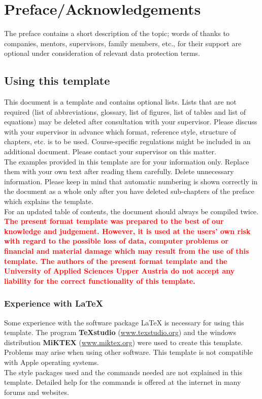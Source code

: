 \chapter{Preface/Acknowledgements}
The preface contains a short description of the topic; words of thanks to companies, mentors, supervisors, family members, etc., for their support are optional under consideration of relevant data protection terms.

\section{Using this template}
This document is a template and contains optional lists. Lists that are not required (list of abbreviations, glossary, list of figures, list of tables and list of equations) may be deleted after consultation with your supervisor. Please discuss with your supervisor in advance which format, reference style, structure of chapters, etc. is to be used. Course-specific regulations might be included in an additional document. Please contact your supervisor on this matter.
\vspace{6pt}\\
The examples provided in this template are for your information only. Replace them with your own text after reading them carefully. Delete unnecessary information. Please keep in mind that automatic numbering is shown correctly in the document as a whole only after you have deleted sub-chapters of the preface which explains the template.
\vspace{6pt}\\
For an updated table of contents, the document should always be compiled twice.
\vspace{6pt}\\
\textcolor{red}{\textbf{The present format template was prepared to the best of our knowledge and judgement. However, it is used at the users’ own risk with regard to the possible loss of data, computer problems or financial and material damage which may result from the use of this template. The authors of the present format template and the University of Applied Sciences Upper Austria do not accept any liability for the correct functionality of this template.}}



\newpage
\subsection{Experience with \LaTeX}
Some experience with the software package {\LaTeX} is necessary for using this template. The program \textbf{TeXstudio} (\url{www.texstudio.org}) and the windows distribution \textbf{MiKTEX} (\url{www.miktex.org}) were used to create this template. Problems may arise when using other software. This template is not compatible with Apple operating systems.\\
The style packages used and the commands needed are not explained in this template. Detailed help for the commands is offered at the internet in many forums and websites.

